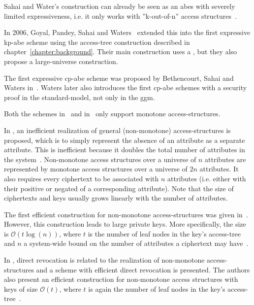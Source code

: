 Sahai and Water's construction can already be seen as an \acrshort{abes} with severely limited expressiveness, i.e. it only works with ''k-out-of-n'' access structures~\cite{goyal_attribute-based_2006}.

In 2006, Goyal, Pandey, Sahai and Waters~\cite{goyal_attribute-based_2006} extended this into the first expressive \acrlong{kp-abe} scheme using the \gls{access-tree} construction described in chapter~\ref{chapter:background}.
Their main construction uses a , but they also propose a \gls{large-universe} construction.

The first expressive \acrlong{cp-abe} scheme was proposed by Bethencourt, Sahai and Waters in~\cite{bethencourt_ciphertext-policy_2007}.
Waters \cite{waters_ciphertext-policy_2011} later also introduces the first \acrshort{cp-abe} schemes with a security proof in the \gls{standard-model}, not only in the \gls{ggm}.

Both the schemes in~\cite{goyal_attribute-based_2006} and in~\cite{bethencourt_ciphertext-policy_2007} only support monotone \glspl{access-structure}.

In \cite{goyal_attribute-based_2006}, an inefficient realization of general (non-monotone) \glspl{access-structure} is proposed, which is to simply represent the absence of an attribute as a separate attribute.
This is inefficient because it doubles the total number of attributes in the system~\cite{goyal_attribute-based_2006}. 
Non-monotone access structures over a universe of $n$ attributes are represented by monotone access structures over a universe of $2n$ attributes.
It also requires every ciphertext to be associated with $n$ attributes (i.e. either with their positive or negated of a corresponding attribute).
Note that the size of ciphertexts and keys usually grows linearly with the number of attributes.

The first efficient construction for non-monotone \glspl{access-structure} was given in~\cite{ostrovsky_attribute-based_2007}. 
However, this construction leads to large private keys.
More specifically, the size is $\mathcal{O}(t \log(n))$, where $t$ is the number of leaf nodes in the key's \gls{access-tree} and $n$ a system-wide bound on the number of attributes a ciphertext may have~\cite{lewko_revocation_2008}.

In \cite{lewko_revocation_2008}, direct revocation is related to the realization of non-monotone \glspl{access-structure} and a scheme with efficient direct revocation is presented.
The authors also present an efficient construction for non-monotone access structures with keys of size $\mathcal{O}(t)$, where $t$ is again the number of leaf nodes in the key's \gls{access-tree}~\cite{lewko_revocation_2008}.

